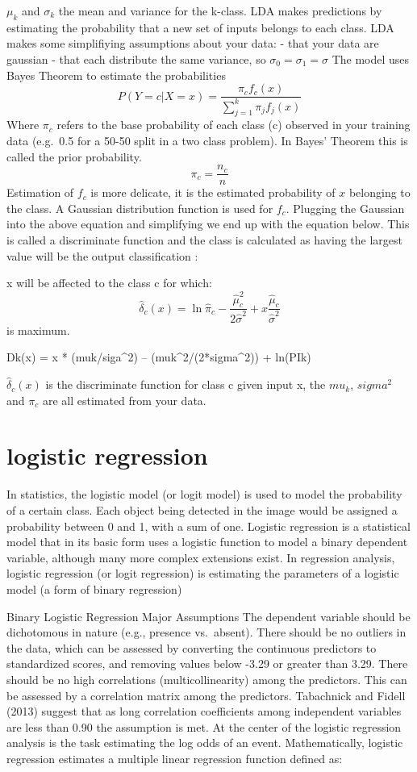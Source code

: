 \documentclass[
]{report}
\begin{document}
\(\mu_k\) and \(\sigma_k\) the mean and variance for the k-class.
LDA makes predictions by estimating the probability that a new set of inputs belongs to each class.
LDA makes some simplifiying assumptions about your data:
- that your data are gaussian
- that each distribute the same variance, so \(\sigma_0 = \sigma_1 = \sigma\)
The model uses Bayes Theorem to estimate the probabilities
\[P(Y=c|X=x) = \frac{\pi_c f_c(x)}{\sum_{j=1}^k \pi_j f_j(x)}\]
Where \(\pi_c\) refers to the base probability of each class (c) observed in your training data (e.g.~0.5 for a 50-50 split in a two class problem). In Bayes' Theorem this is called the prior probability.
\[\pi_c=\frac{n_c}{n}\]
Estimation of \(f_c\) is more delicate, it is the estimated probability of \(x\) belonging to the class. A Gaussian distribution function is used for \(f_c\). Plugging the Gaussian into the above equation and simplifying we end up with the equation below. This is called a discriminate function and the class is calculated as having the largest value will be the output classification :

x will be affected to the class c for which:
\[\hat\delta_c(x) = \ln \hat\pi_c - \frac{\hat\mu_c^2}{2\hat\sigma^2} + x\frac{\hat\mu_c}{\hat\sigma^2}\] is maximum.

Dk(x) = x * (muk/siga\^{}2) -- (muk\^{}2/(2*sigma\^{}2)) + ln(PIk)

\(\hat\delta_c(x)\) is the discriminate function for class c given input x, the \(mu_k\), \(sigma^2\) and \(\pi_c\) are all estimated from your data.

\hypertarget{logistic-regression}{%
\section{logistic regression}\label{logistic-regression}}

In statistics, the logistic model (or logit model) is used to model the probability of a certain class. Each object being detected in the image would be assigned a probability between 0 and 1, with a sum of one. Logistic regression is a statistical model that in its basic form uses a logistic function to model a binary dependent variable, although many more complex extensions exist. In regression analysis, logistic regression (or logit regression) is estimating the parameters of a logistic model (a form of binary regression)

Binary Logistic Regression Major Assumptions
The dependent variable should be dichotomous in nature (e.g., presence vs.~absent).
There should be no outliers in the data, which can be assessed by converting the continuous predictors to standardized scores, and removing values below -3.29 or greater than 3.29.
There should be no high correlations (multicollinearity) among the predictors. This can be assessed by a correlation matrix among the predictors. Tabachnick and Fidell (2013) suggest that as long correlation coefficients among independent variables are less than 0.90 the assumption is met.
At the center of the logistic regression analysis is the task estimating the log odds of an event. Mathematically, logistic regression estimates a multiple linear regression function defined as:
\end{document}
